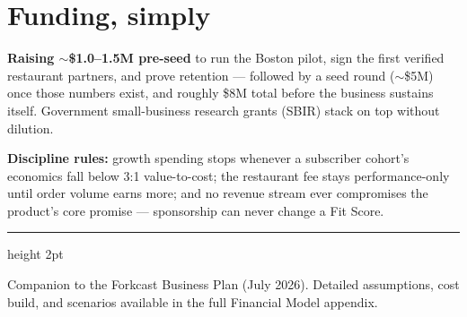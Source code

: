 \documentclass[10pt]{article}
\begin{document}
\section{Funding, simply}

\textbf{Raising $\sim$\$1.0--1.5M pre-seed} to run the Boston pilot, sign the first verified restaurant partners, and prove retention --- followed by a seed round ($\sim$\$5M) once those numbers exist, and roughly \$8M total before the business sustains itself. Government small-business research grants (SBIR) stack on top without dilution.

\vspace{6pt}
\textbf{Discipline rules:} growth spending stops whenever a subscriber cohort's economics fall below 3:1 value-to-cost; the restaurant fee stays performance-only until order volume earns more; and no revenue stream ever compromises the product's core promise --- sponsorship can never change a Fit Score.

\vspace{12pt}
{\color{ground}\hrule height 2pt}
\vspace{4pt}
{\small\color{muted}Companion to the Forkcast Business Plan (July 2026). Detailed assumptions, cost build, and scenarios available in the full Financial Model appendix.}
\end{document}
